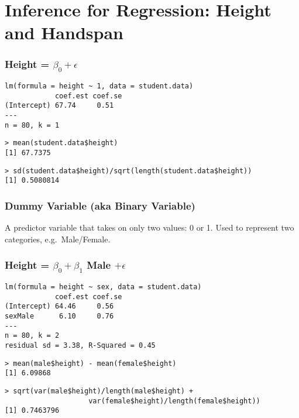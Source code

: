 \section{Inference for Regression: Height and Handspan}
\begin{frame}[fragile]
\frametitle{Height = $\beta_0 +  \epsilon$}
\footnotesize
\begin{verbatim}
lm(formula = height ~ 1, data = student.data)
            coef.est coef.se
(Intercept) 67.74     0.51  
---
n = 80, k = 1
\end{verbatim}
\pause
\begin{verbatim}
> mean(student.data$height)
[1] 67.7375
\end{verbatim}
\pause
\begin{verbatim}
> sd(student.data$height)/sqrt(length(student.data$height))
[1] 0.5080814
\end{verbatim}
\end{frame}

\begin{frame}
\frametitle{Dummy Variable (aka Binary Variable)}
 
A predictor variable that takes on only two values: 0 or 1. Used to represent two categories, e.g.\ Male/Female.
\end{frame}



\begin{frame}[fragile]
\frametitle{Height = $\beta_0 + \beta_1$ Male $+ \epsilon$}

\footnotesize
\begin{verbatim}
lm(formula = height ~ sex, data = student.data)
            coef.est coef.se
(Intercept) 64.46     0.56  
sexMale      6.10     0.76  
---
n = 80, k = 2
residual sd = 3.38, R-Squared = 0.45
\end{verbatim}
\pause
\begin{verbatim}
> mean(male$height) - mean(female$height)
[1] 6.09868
\end{verbatim}
\pause
\begin{verbatim}
> sqrt(var(male$height)/length(male$height) +
		 			var(female$height)/length(female$height))
[1] 0.7463796
\end{verbatim}
\end{frame}




